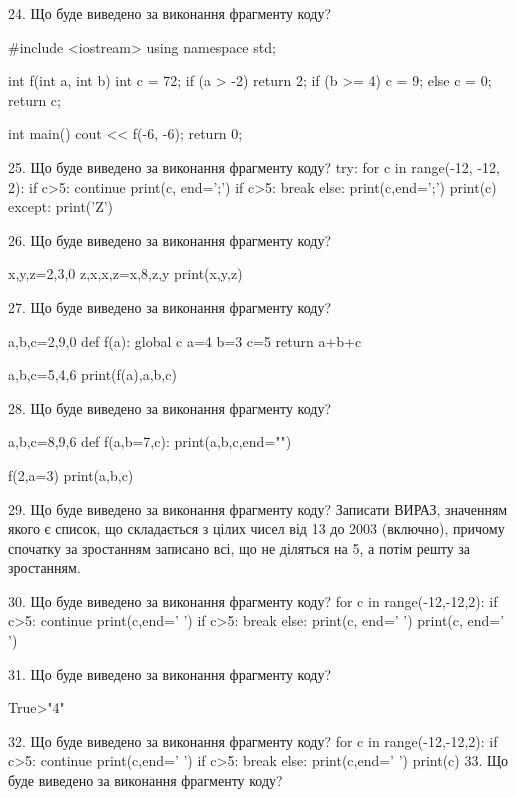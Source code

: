 \documentclass[11pt]{article}
\begin{document}
24. Що буде виведено за виконання фрагменту коду?

#include <iostream>
using namespace std;

int f(int a, int b){
    int c = 72;
    if (a > -2)
        return 2;
    if (b >= 4)
         c = 9;
    else 
        c = 0;
    return c;
}

int main(){
    cout << f(-6, -6);
    return 0;
}

25. Що буде виведено за виконання фрагменту коду?
try:
    for c in range(-12, -12, 2):
        if c>5:
            continue
        print(c, end=';')
        if c>5:
            break
    else:
        print(c,end=';')
    print(c)
except:
    print('Z')

26. Що буде виведено за виконання фрагменту коду?

x,y,z=2,3,0
z,x,x,z=x,8,z,y
print(x,y,z)

27. Що буде виведено за виконання фрагменту коду?

a,b,c=2,9,0
def f(a):
global c    a=4
    b=3
    c=5
    return a+b+c

a,b,c=5,4,6
print(f(a),a,b,c)

28. Що буде виведено за виконання фрагменту коду?

a,b,c=8,9,6
def f(a,b=7,c):
    print(a,b,c,end="")

f(2,a=3)
print(a,b,c)


29. Що буде виведено за виконання фрагменту коду?
Записати ВИРАЗ, значенням якого є список, що складається з цілих чисел від 13 до 2003 (включно), причому спочатку за зростанням записано всі, що не діляться на 5, а потім решту за зростанням.

30. Що буде виведено за виконання фрагменту коду?
for c in range(-12,-12,2):
    if c>5:
        continue
        print(c,end=' ')
    if c>5:
        break
else:
    print(c, end=' ')
print(c, end=' ')

31. Що буде виведено за виконання фрагменту коду?

True>"4"

32. Що буде виведено за виконання фрагменту коду?
for c in range(-12,-12,2):
     if c>5: continue
     print(c,end=' ')
     if c>5: break
   else: print(c,end=' ')
   print(c)
33. Що буде виведено за виконання фрагменту коду?
\end{document}
